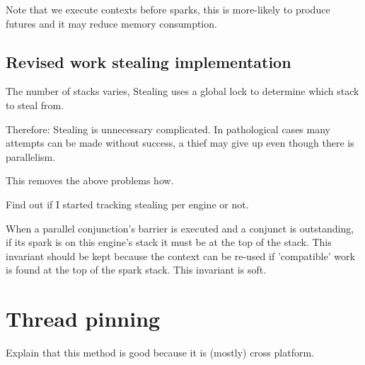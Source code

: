 
Note that we execute contexts before sparks,
this is more-likely to produce futures and it may reduce memory consumption.

\subsection{Revised work stealing implementation}




The number of stacks varies,
Stealing uses a global lock to determine which stack to steal from.

Therefore:
Stealing is unnecessary complicated.
In pathological cases many attempts can be made without success,
a thief may give up even though there is parallelism.

This removes the above problems how.

Find out if I started tracking stealing per engine or not.

When a parallel conjunction's barrier is executed and a conjunct is
outstanding, if its spark is on this engine's stack it must be at the top of
the stack.
This invariant should be kept because the context can be re-used if
'compatible' work is found at the top of the spark stack.
This invariant is soft.




\section{Thread pinning}
\label{sec:thread_pinning}


Explain that this method is good because it is (mostly) cross platform.

